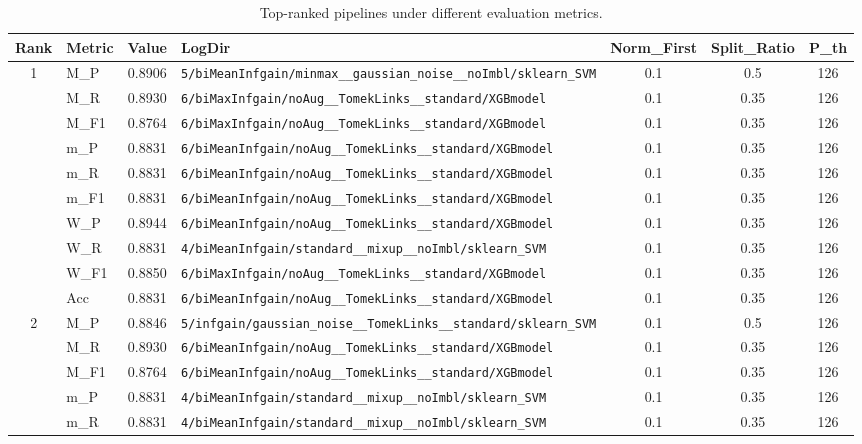 \begin{table}[htbp]
\caption{Top-ranked pipelines under different evaluation metrics.}
\label{tab:rank_metric_vertical}
\centering
\small
\setlength{\tabcolsep}{4pt}
\begin{tabular}{|c|l|c|>{\ttfamily\footnotesize}p{7.2cm}|c|c|c|}
\hline
Rank & Metric & Value & LogDir & Norm\_First & Split\_Ratio & P\_th \\
\hline
\multirow{10}{*}{1} & M\_P & 0.8906 & \texttt{5/biMeanInfgain/minmax\_\_gaussian\_noise\_\_noImbl/sklearn\_SVM} & 0.1 & 0.5  & 126 \\ 
 & M\_R & 0.8930 & \texttt{6/biMaxInfgain/noAug\_\_TomekLinks\_\_standard/XGBmodel} & 0.1 & 0.35  & 126 \\ 
 & M\_F1 & 0.8764 & \texttt{6/biMaxInfgain/noAug\_\_TomekLinks\_\_standard/XGBmodel} & 0.1 & 0.35  & 126 \\ 
 & m\_P & 0.8831 & \texttt{6/biMeanInfgain/noAug\_\_TomekLinks\_\_standard/XGBmodel} & 0.1 & 0.35  & 126 \\ 
 & m\_R & 0.8831 & \texttt{6/biMeanInfgain/noAug\_\_TomekLinks\_\_standard/XGBmodel} & 0.1 & 0.35  & 126 \\ 
 & m\_F1 & 0.8831 & \texttt{6/biMeanInfgain/noAug\_\_TomekLinks\_\_standard/XGBmodel} & 0.1 & 0.35  & 126 \\ 
 & W\_P & 0.8944 & \texttt{6/biMeanInfgain/noAug\_\_TomekLinks\_\_standard/XGBmodel} & 0.1 & 0.35  & 126 \\ 
 & W\_R & 0.8831 & \texttt{4/biMeanInfgain/standard\_\_mixup\_\_noImbl/sklearn\_SVM} & 0.1 & 0.35  & 126 \\ 
 & W\_F1 & 0.8850 & \texttt{6/biMaxInfgain/noAug\_\_TomekLinks\_\_standard/XGBmodel} & 0.1 & 0.35  & 126 \\ 
 & Acc & 0.8831 & \texttt{6/biMeanInfgain/noAug\_\_TomekLinks\_\_standard/XGBmodel} & 0.1 & 0.35  & 126 \\ 
\hline
\multirow{10}{*}{2} & M\_P & 0.8846 & \texttt{5/infgain/gaussian\_noise\_\_TomekLinks\_\_standard/sklearn\_SVM} & 0.1 & 0.5  & 126 \\ 
 & M\_R & 0.8930 & \texttt{6/biMeanInfgain/noAug\_\_TomekLinks\_\_standard/XGBmodel} & 0.1 & 0.35  & 126 \\ 
 & M\_F1 & 0.8764 & \texttt{6/biMeanInfgain/noAug\_\_TomekLinks\_\_standard/XGBmodel} & 0.1 & 0.35  & 126 \\ 
 & m\_P & 0.8831 & \texttt{4/biMeanInfgain/standard\_\_mixup\_\_noImbl/sklearn\_SVM} & 0.1 & 0.35  & 126 \\ 
 & m\_R & 0.8831 & \texttt{4/biMeanInfgain/standard\_\_mixup\_\_noImbl/sklearn\_SVM} & 0.1 & 0.35  & 126 \\ 

\end{tabular}
\end{table}
